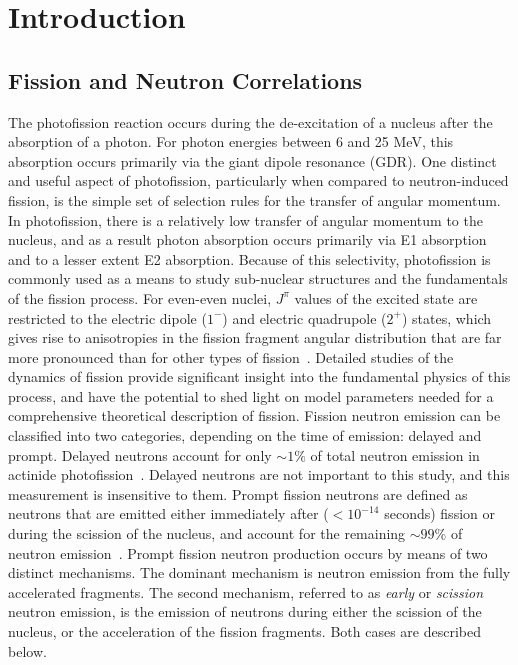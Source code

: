 \chapter{Introduction}
\label{sec:level1}

\section{Fission and Neutron Correlations}
The photofission reaction occurs during the de-excitation of a nucleus after the absorption of a photon.
For photon energies between 6 and 25 MeV, this absorption occurs primarily via the giant dipole resonance (GDR).
One distinct and useful aspect of photofission, particularly when compared to neutron-induced fission, is the simple set of selection rules for the transfer of angular momentum.
In photofission, there is a relatively low transfer of angular momentum to the nucleus, and as a result photon absorption occurs primarily via E1 absorption and to a lesser extent E2 absorption.
Because of this selectivity, photofission is commonly used as a means to study sub-nuclear structures and the fundamentals of the fission process.
For even-even nuclei, $J^{\pi}$ values of the excited state are restricted to the electric dipole ($1^{-}$) and electric quadrupole ($2^{+}$) states, which gives rise to anisotropies in the fission fragment angular distribution that are far more pronounced than for other types of fission~\cite{1977FragAss}.
Detailed studies of the dynamics of fission provide significant insight into the fundamental physics of this process, and have the potential to shed light on model parameters needed for a comprehensive theoretical description of fission.
Fission neutron emission can be classified into two categories, depending on the time of emission: delayed and prompt.
Delayed neutrons account for only $\sim1\%$ of total neutron emission in actinide photofission~\cite{Caldwell2017DelayedNs}.
Delayed neutrons are not important to this study, and this measurement is insensitive to them.
Prompt fission neutrons are defined as neutrons that are emitted either immediately after ($<10^{-14}$ seconds) fission or during the scission of the nucleus, and account for the remaining $\sim99\%$ of neutron emission~\cite{Caldwell2017DelayedNs}.
Prompt fission neutron production occurs by means of two distinct mechanisms.
The dominant mechanism is neutron emission from the fully accelerated fragments.
The second mechanism, referred to as \textit{early} or \textit{scission} neutron emission, is the emission of neutrons during either the scission of the nucleus, or the acceleration of the fission fragments.
Both cases are described below.

